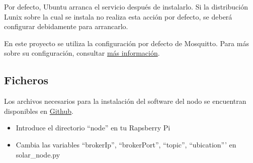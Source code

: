 Por defecto, Ubuntu arranca el servicio después de instalarlo. Si la distribución Lunix sobre la cual se instala no realiza esta acción por defecto, se deberá configurar debidamente para arrancarlo.

En este proyecto se utiliza la configuración por defecto de Mosquitto. Para más sobre su configuración, consultar \href{https://www.digitalocean.com/community/tutorials/how-to-install-and-secure-the-mosquitto-mqtt-messaging-broker-on-ubuntu-16-04}{más información}.

\subsection{Ficheros}
\label{makereference8.1.3}
Los archivos necesarios para la instalación del software del nodo se encuentran disponibles en \href{https://github.com/MrSlide22/TFG/node}{Github}.

\begin{itemize}
	\item Introduce el directorio ``node'' en tu Rapsberry Pi
	\item Cambia las variables ``brokerIp'', ``brokerPort'', ``topic'', ``ubication''' en solar\_node.py
\end{itemize}

